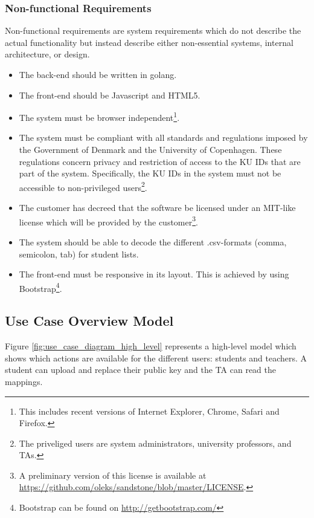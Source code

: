 \documentclass[11pt,a4paper]{report}
\begin{document}
\subsubsection{Non-functional Requirements}\label{subsubsec:Non_Functional_Req}
Non-functional requirements are system requirements which do not describe the actual functionality but instead describe either non-essential systems, internal architecture, or design.
\begin{itemize}
\item The back-end should be written in golang.
\item The front-end should be Javascript and HTML5.
\item The system must be browser independent\footnote{This includes recent versions of Internet Explorer, Chrome, Safari and Firefox.}.
\item The system must be compliant with all standards and regulations imposed by the Government of Denmark and the University of Copenhagen. These regulations concern privacy and restriction of access to the KU IDs that are part of the system. Specifically, the KU IDs in the system must not be accessible to non-privileged users\footnote{The priveliged users are system administrators, university professors, and TAs.}.
\item The customer has decreed that the software be licensed under an MIT-like license which will be provided by the customer\footnote{A preliminary version of this license is available at \href{https://github.com/oleks/sandstone/blob/master/LICENSE}{https://github.com/oleks/sandstone/blob/master/LICENSE}.}.
\item The system should be able to decode the different .csv-formats (comma, semicolon, tab) for student lists.
\item The front-end must be responsive in its layout. This is achieved by using Bootstrap\footnote{Bootstrap can be found on \href{http://getbootstrap.com/}{http://getbootstrap.com/}}.
\end{itemize}

\subsection{Use Case Overview Model}\label{subsec:Use_case_model}

Figure \ref{fig:use_case_diagram_high_level} represents a high-level model which shows which actions are available for the different users: students and teachers.
A student can upload and replace their public key and the TA can read the mappings.
\end{document}
